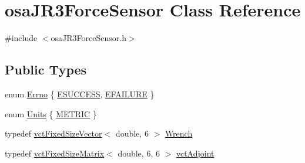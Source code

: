 \hypertarget{classosa_j_r3_force_sensor}{}\section{osa\+J\+R3\+Force\+Sensor Class Reference}
\label{classosa_j_r3_force_sensor}


{\ttfamily \#include $<$osa\+J\+R3\+Force\+Sensor.\+h$>$}

\subsection*{Public Types}
\begin{DoxyCompactItemize}
\item 
enum \hyperlink{classosa_j_r3_force_sensor_a6b27d3a601fae1547fb13d2a4ef97e4a}{Errno} \{ \hyperlink{classosa_j_r3_force_sensor_a6b27d3a601fae1547fb13d2a4ef97e4aa003231bdd29312cc03b4c91a8688201c}{E\+S\+U\+C\+C\+E\+S\+S}, 
\hyperlink{classosa_j_r3_force_sensor_a6b27d3a601fae1547fb13d2a4ef97e4aaa68c1cf87ef1d6c95b7603f393187218}{E\+F\+A\+I\+L\+U\+R\+E}
 \}
\item 
enum \hyperlink{classosa_j_r3_force_sensor_ac94f1969d4d2089487b912dd0ef7592f}{Units} \{ \hyperlink{classosa_j_r3_force_sensor_ac94f1969d4d2089487b912dd0ef7592faf9d1cb83e02904b93520796fff2d9161}{M\+E\+T\+R\+I\+C}
 \}
\item 
typedef \hyperlink{classvct_fixed_size_vector}{vct\+Fixed\+Size\+Vector}$<$ double, 6 $>$ \hyperlink{classosa_j_r3_force_sensor_afcfc2ba175b2e7ef9f86c6394c8966d2}{Wrench}
\item 
typedef \hyperlink{classvct_fixed_size_matrix}{vct\+Fixed\+Size\+Matrix}$<$ double, 6, 6 $>$ \hyperlink{classosa_j_r3_force_sensor_af769666ad69e4db31c2891ddf67d2abd}{vct\+Adjoint}
\end{DoxyCompactItemize}
